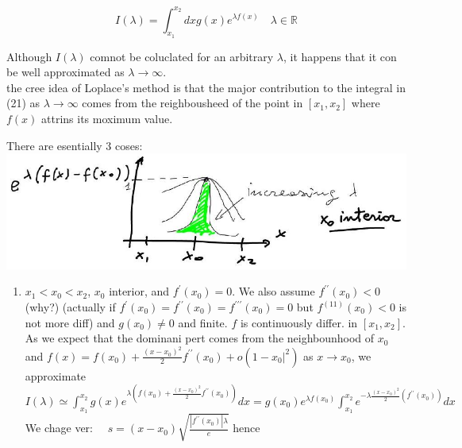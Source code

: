 \documentclass[10pt]{article}
\begin{document}
\begin{equation*}
I(\lambda)=\int_{x_{1}}^{x_{2}} d x g(x) e^{\lambda f(x)} \quad \lambda \in \mathbb{R} \tag{21}
\end{equation*}


Although $I(\lambda)$ comnot be coluclated for an arbitrary $\lambda$, it happens that it con be well approximated as $\lambda \rightarrow \infty$.\\
the cree idea of Loplace's method is that the major contribution to the integral in (21) as $\lambda \rightarrow \infty$ comes from the reighbousheed of the point in $\left[x_{1}, x_{2}\right]$ where $f(x)$ attrins its moximum value.

There are esentially 3 coses:\\
\includegraphics[max width=\textwidth, center]{2025_10_17_86b952e516931f75c0b7g-05}

\begin{enumerate}
  \item $x_{1}<x_{0}<x_{2}$, $x_{0}$ interior, and $f^{\prime}\left(x_{0}\right)=0$. We also assume $f^{\prime \prime}\left(x_{0}\right)<0$ (why?) (actually if $f^{\prime}\left(x_{0}\right)=f^{\prime \prime}\left(x_{0}\right)=f^{\prime \prime \prime}\left(x_{0}\right)=0$ but $f^{(11)}\left(x_{0}\right)<0$ is not more diff) and $g\left(x_{0}\right) \neq 0$ and finite. $f$ is continuously differ. in $\left[x_{1}, x_{2}\right]$.\\
As we expect that the dominani pert comes from the neighbounhood of $x_{0}$ and $f(x)=f\left(x_{0}\right)+\frac{\left(x-x_{0}\right)^{2}}{2} f^{\prime \prime}\left(x_{0}\right)+o\left(1-\left.x_{0}\right|^{2}\right)$ as $x \rightarrow x_{0}$, we approximate\\
$I(\lambda) \simeq \int_{x_{1}}^{x_{2}} g(x) e^{\lambda\left(f\left(x_{0}\right)+\frac{\left(x-x_{0}\right)^{2}}{2} f^{\prime \prime}\left(x_{0}\right)\right)} d x=g\left(x_{0}\right) e^{\lambda f\left(x_{0}\right)} \int_{x_{1}}^{x_{2}} e^{-\lambda \frac{\left(x-x_{0}\right)^{2}}{2}\left(f^{\prime \prime}\left(x_{0}\right)\right)} d x$\\
We chage ver: $\quad s=\left(x-x_{0}\right) \sqrt{\frac{\left|f^{\prime \prime}\left(x_{0}\right)\right| \lambda}{e}}$ hence
\end{enumerate}
\end{document}
